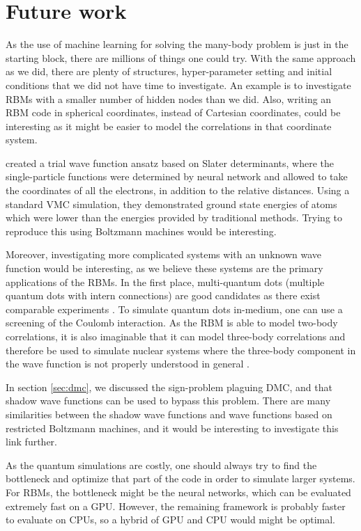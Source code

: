 \section*{Future work}
As the use of machine learning for solving the many-body problem is just in the starting block, there are millions of things one could try. With the same approach as we did, there are plenty of structures, hyper-parameter setting and initial conditions that we did not have time to investigate. An example is to investigate RBMs with a smaller number of hidden nodes than we did. Also, writing an RBM code in spherical coordinates, instead of Cartesian coordinates, could be interesting as it might be easier to model the correlations in that coordinate system.

\citet{pfau2019abinitio} created a trial wave function ansatz based on Slater determinants, where the single-particle functions were determined by neural network and allowed to take the coordinates of all the electrons, in addition to the relative distances. Using a standard VMC simulation, they demonstrated ground state energies of atoms which were lower than the energies provided by traditional methods. Trying to reproduce this using Boltzmann machines would be interesting.

Moreover, investigating more complicated systems with an unknown wave function would be interesting, as we believe these systems are the primary applications of the RBMs. In the first place, multi-quantum dots (multiple quantum dots with intern connections) are good candidates as there exist comparable experiments \supercite{marzin_photoluminescence_1994,brunner_sharp-line_1994}. To simulate quantum dots in-medium, one can use a screening of the Coulomb interaction. As the RBM is able to model two-body correlations, it is also imaginable that it can model three-body correlations and therefore be used to simulate nuclear systems where the three-body component in the wave function is not properly understood in general \supercite{sauer_three-nucleon_2014}.

In section \ref{sec:dmc}, we discussed the sign-problem plaguing DMC, and that shadow wave functions can be used to bypass this problem. There are many similarities between the shadow wave functions and wave functions based on restricted Boltzmann machines, and it would be interesting to investigate this link further.

As the quantum simulations are costly, one should always try to find the bottleneck and optimize that part of the code in order to simulate larger systems. For RBMs, the bottleneck might be the neural networks, which can be evaluated extremely fast on a GPU. However, the remaining framework is probably faster to evaluate on CPUs, so a hybrid of GPU and CPU would might be optimal.
